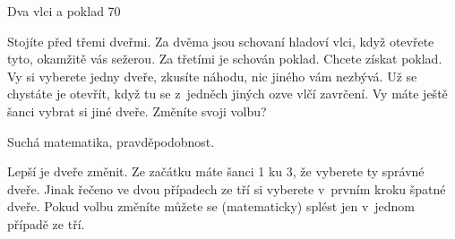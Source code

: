 Dva vlci a poklad
70 %

Stojíte před třemi dveřmi. Za dvěma jsou schovaní hladoví vlci, když otevřete tyto, okamžitě vás sežerou. Za třetími je schován poklad. Chcete získat poklad. Vy si vyberete jedny dveře, zkusíte náhodu, nic jiného vám nezbývá. Už se chystáte je otevřít, když tu se z~jedněch jiných ozve vlčí zavrčení. Vy máte ještě šanci vybrat si jiné dveře. Změníte svoji volbu?

Suchá matematika, pravděpodobnost.

Lepší je dveře změnit. Ze začátku máte šanci 1 ku 3, že vyberete ty správné dveře. Jinak řečeno ve dvou případech ze tří si vyberete v~prvním kroku špatné dveře. Pokud volbu změníte můžete se (matematicky) splést jen v~jednom případě ze tří.
